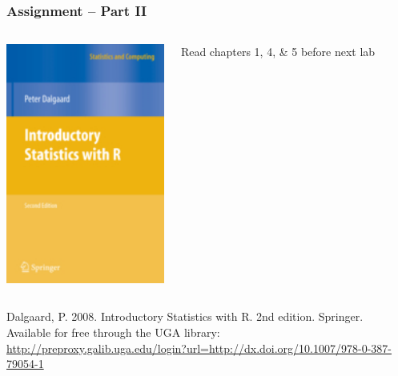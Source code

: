 \documentclass[color=usenames,dvipsnames]{beamer}\usepackage[]{graphicx}\usepackage[]{color}
\begin{document}
\begin{frame}[fragile]
  \frametitle{Assignment -- Part II}
  \begin{columns}
    \begin{column}{0.3\textwidth}
      \includegraphics[width=1\textwidth]{figs/introStatsR} \\
    \end{column}
    \begin{column}{0.6\textwidth}
      Read chapters 1, 4, \& 5 before next lab
    \end{column}
  \end{columns}
  \vfill
  \footnotesize
  Dalgaard, P. 2008. Introductory Statistics with R. 2nd
  edition. Springer. \\
  Available for free through the UGA library: \\ \tiny
  \url{http://preproxy.galib.uga.edu/login?url=http://dx.doi.org/10.1007/978-0-387-79054-1}
\end{frame}
\end{document}
